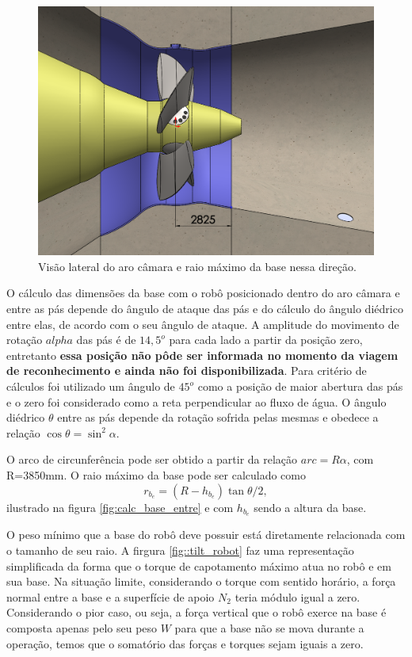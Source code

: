 \begin{figure}[h!]
\centering
	\includegraphics[width=0.9\columnwidth]{figs/base/turbine_side}
	\caption{Visão lateral do aro câmara e raio máximo da base nessa direção.}
	\label{fig::turbine_side}
\end{figure}

O cálculo das dimensões da base com o robô posicionado dentro do aro câmara e
entre as pás depende do ângulo de ataque das pás e do cálculo do ângulo diédrico
entre elas, de acordo com o seu ângulo de ataque. A amplitude do movimento de
rotação $alpha$ das pás é de $14,5^o$ para cada lado a partir da posição zero, entretanto \textbf{essa posição não pôde ser
informada no momento da viagem de reconhecimento e ainda não foi
disponibilizada}. Para critério de cálculos foi utilizado um ângulo de
$45^o$ como a posição de maior abertura das pás e o zero foi considerado como
a reta perpendicular ao fluxo de água. O ângulo diédrico $\theta$ entre as pás depende da rotação
sofrida pelas mesmas e obedece a relação $\cos{\theta} = \sin^2{\alpha}.$

O arco de circunferência pode ser obtido a partir da relação $arc=R\alpha$, com
R=3850mm. O raio máximo da base pode ser calculado como 
$$r_{b_e} = (R - h_{b_e})\tan{\theta/2},$$  ilustrado na figura
\ref{fig:calc_base_entre} e com $h_{b_e}$ sendo a altura da base.

O peso mínimo que a base do robô deve possuir está diretamente relacionada com o
tamanho de seu raio. A firgura \ref{fig::tilt_robot} faz uma representação
simplificada da forma que o torque de capotamento máximo atua no robô e em sua
base. Na situação limite, considerando o torque com sentido horário, a força
normal entre a base e a superfície de apoio $N_2$ teria módulo igual a zero.
Considerando o pior caso, ou seja, a força vertical que o robô exerce na base é
composta apenas pelo seu peso $W$ para que a base não se mova durante a
operação, temos que o somatório das forças e torques sejam iguais a zero.

